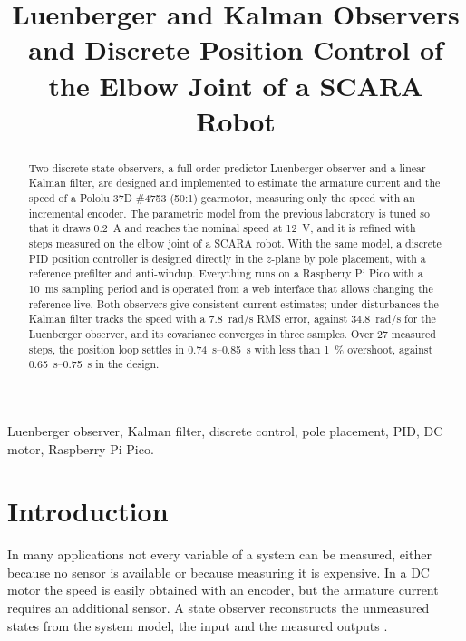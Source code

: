 \documentclass[conference,a4paper]{IEEEtran}
\begin{document}
\title{Luenberger and Kalman Observers and Discrete Position Control of the Elbow Joint of a SCARA Robot}

\author{
}

\maketitle

\begin{abstract}
Two discrete state observers, a full-order predictor Luenberger observer and a linear Kalman filter, are designed and implemented to estimate the armature current and the speed of a Pololu 37D \#4753 (50:1) gearmotor, measuring only the speed with an incremental encoder. The parametric model from the previous laboratory is tuned so that it draws \SI{0.2}{A} and reaches the nominal speed at \SI{12}{V}, and it is refined with steps measured on the elbow joint of a SCARA robot. With the same model, a discrete PID position controller is designed directly in the $z$-plane by pole placement, with a reference prefilter and anti-windup. Everything runs on a Raspberry Pi Pico with a \SI{10}{ms} sampling period and is operated from a web interface that allows changing the reference live. Both observers give consistent current estimates; under disturbances the Kalman filter tracks the speed with a \SI{7.8}{rad/s} RMS error, against \SI{34.8}{rad/s} for the Luenberger observer, and its covariance converges in three samples. Over 27 measured steps, the position loop settles in \SIrange{0.74}{0.85}{s} with less than \SI{1}{\percent} overshoot, against \SIrange{0.65}{0.75}{s} in the design.
\end{abstract}

\begin{IEEEkeywords}
Luenberger observer, Kalman filter, discrete control, pole placement, PID, DC motor, Raspberry Pi Pico.
\end{IEEEkeywords}

\section{Introduction}
In many applications not every variable of a system can be measured, either because no sensor is available or because measuring it is expensive. In a DC motor the speed is easily obtained with an encoder, but the armature current requires an additional sensor. A state observer reconstructs the unmeasured states from the system model, the input and the measured outputs \cite{ogata}.
\end{document}
